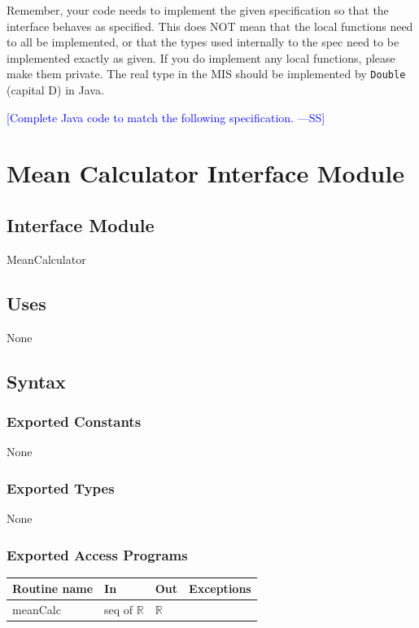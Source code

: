 \documentclass[12pt,fleqn]{examtst}
\newcommand{\authornote}[3]{\textcolor{#1}{[#3 ---#2]}}
\newcommand{\authornote}[3]{}
\newcommand{\wss}[1]{\authornote{blue}{SS}{#1}}
\begin{document}
Remember, your code needs to implement the given specification so that the
interface behaves as specified.  This does NOT mean that the local functions
need to all be implemented, or that the types used internally to the spec need
to be implemented exactly as given.  If you do implement any local functions,
please make them private.  The real type in the MIS should be implemented by
\texttt{Double} (capital D) in Java.

\wss{Complete Java code to match the following specification.}


\newpage

\section* {Mean Calculator Interface Module}

\subsection*{Interface Module}

MeanCalculator

\subsection* {Uses}

None

\subsection* {Syntax}

\subsubsection* {Exported Constants}

None

\subsubsection* {Exported Types}

None 

\subsubsection* {Exported Access Programs}

\begin{tabular}{| l | l | l | p{5cm} |}
\hline
\textbf{Routine name} & \textbf{In} & \textbf{Out} & \textbf{Exceptions}\\
\hline
meanCalc & seq of $\mathbb{R}$ & $\mathbb{R}$ & ~\\
\hline
\end{tabular}
\end{document}
